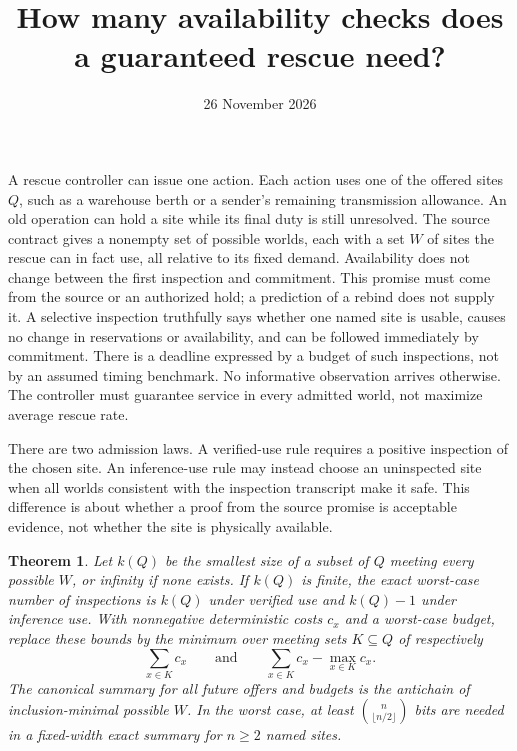 \documentclass[11pt]{article}
\title{How many availability checks does a guaranteed rescue need?}
\author{}
\date{26 November 2026}
\newtheorem{theorem}{Theorem}
\begin{document}
\maketitle

A rescue controller can issue one action. Each action uses one of the offered sites $Q$, such as a warehouse berth or a sender's remaining transmission allowance. An old operation can hold a site while its final duty is still unresolved. The source contract gives a nonempty set of possible worlds, each with a set $W$ of sites the rescue can in fact use, all relative to its fixed demand. Availability does not change between the first inspection and commitment. This promise must come from the source or an authorized hold; a prediction of a rebind does not supply it. A selective inspection truthfully says whether one named site is usable, causes no change in reservations or availability, and can be followed immediately by commitment. There is a deadline expressed by a budget of such inspections, not by an assumed timing benchmark. No informative observation arrives otherwise. The controller must guarantee service in every admitted world, not maximize average rescue rate.

There are two admission laws. A verified-use rule requires a positive inspection of the chosen site. An inference-use rule may instead choose an uninspected site when all worlds consistent with the inspection transcript make it safe. This difference is about whether a proof from the source promise is acceptable evidence, not whether the site is physically available.

\begin{theorem}
Let $k(Q)$ be the smallest size of a subset of $Q$ meeting every possible $W$, or infinity if none exists. If $k(Q)$ is finite, the exact worst-case number of inspections is $k(Q)$ under verified use and $k(Q)-1$ under inference use. With nonnegative deterministic costs $c_x$ and a worst-case budget, replace these bounds by the minimum over meeting sets $K\subseteq Q$ of respectively
\[
  \sum_{x\in K}c_x
  \qquad\text{and}\qquad
  \sum_{x\in K}c_x-\max_{x\in K}c_x.
\]
The canonical summary for all future offers and budgets is the antichain of inclusion-minimal possible $W$. In the worst case, at least $\binom{n}{\lfloor n/2\rfloor}$ bits are needed in a fixed-width exact summary for $n\ge2$ named sites.
\end{theorem}
\end{document}

